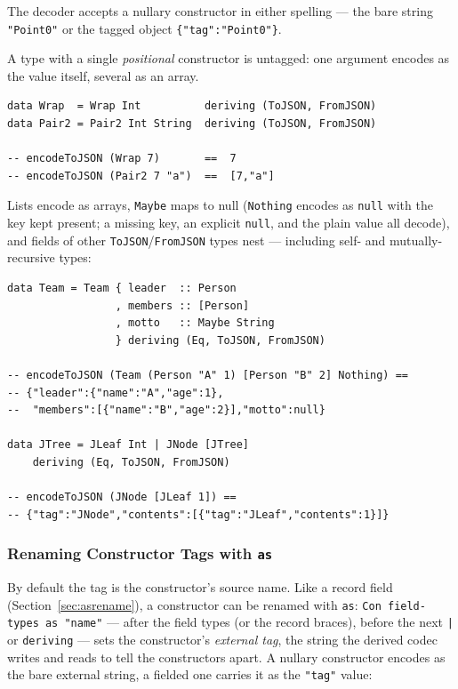 \documentclass[11pt,a4paper]{article}
\begin{document}
The decoder accepts a nullary constructor in either spelling --- the
bare string \texttt{"Point0"} or the tagged object
\texttt{\{"tag":"Point0"\}}.

A type with a single \emph{positional} constructor is untagged: one
argument encodes as the value itself, several as an array.

\begin{lstlisting}
data Wrap  = Wrap Int          deriving (ToJSON, FromJSON)
data Pair2 = Pair2 Int String  deriving (ToJSON, FromJSON)

-- encodeToJSON (Wrap 7)       ==  7
-- encodeToJSON (Pair2 7 "a")  ==  [7,"a"]
\end{lstlisting}

Lists encode as arrays, \texttt{Maybe} maps to null
(\texttt{Nothing} encodes as \texttt{null} with the key kept present;
a missing key, an explicit \texttt{null}, and the plain value all
decode), and fields of other \texttt{ToJSON}/\texttt{FromJSON} types
nest --- including self- and mutually-recursive types:

\begin{lstlisting}
data Team = Team { leader  :: Person
                 , members :: [Person]
                 , motto   :: Maybe String
                 } deriving (Eq, ToJSON, FromJSON)

-- encodeToJSON (Team (Person "A" 1) [Person "B" 2] Nothing) ==
-- {"leader":{"name":"A","age":1},
--  "members":[{"name":"B","age":2}],"motto":null}

data JTree = JLeaf Int | JNode [JTree]
    deriving (Eq, ToJSON, FromJSON)

-- encodeToJSON (JNode [JLeaf 1]) ==
-- {"tag":"JNode","contents":[{"tag":"JLeaf","contents":1}]}
\end{lstlisting}

\subsubsection{Renaming Constructor Tags with \texttt{as}}
\label{sec:conasrename}

By default the tag is the constructor's source name.  Like a record
field (Section~\ref{sec:asrename}), a constructor can be renamed with
\texttt{as}: \texttt{Con field-types as "name"} --- after the field
types (or the record braces), before the next \texttt{|} or
\texttt{deriving} --- sets the constructor's \emph{external tag}, the
string the derived codec writes and reads to tell the constructors
apart.  A nullary constructor encodes as the bare external string, a
fielded one carries it as the \texttt{"tag"} value:
\end{document}
